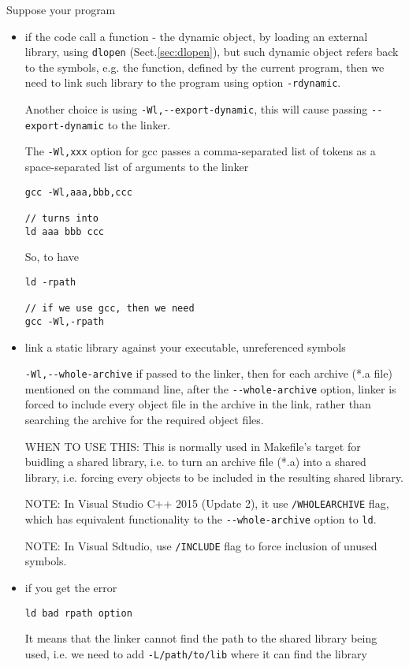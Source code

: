 Suppose your program 
\begin{itemize}
  
  \item  if the code call a function - the dynamic object, by loading an external library, using 
  \verb!dlopen! (Sect.\ref{sec:dlopen}), but such dynamic object refers back to the symbols, e.g. the function, 
  defined by the current program, then we need to link such library to the program using option \verb!-rdynamic!.  
  
  Another choice is using \verb!-Wl,--export-dynamic!, this will cause passing
  \verb!--export-dynamic! to the linker.
  
\begin{mdframed}

The \verb!-Wl,xxx! option for gcc passes a comma-separated list of tokens as a space-separated list of arguments to the linker

\begin{verbatim}
gcc -Wl,aaa,bbb,ccc

// turns into 
ld aaa bbb ccc
\end{verbatim}

So, to have 
\begin{verbatim}
ld -rpath

// if we use gcc, then we need
gcc -Wl,-rpath
\end{verbatim}

\end{mdframed}
  
  \item link a static library against your executable, unreferenced symbols
  
  
\verb!-Wl,--whole-archive! if passed to the linker, then for each archive (*.a
file) mentioned on the command line, after the \verb!--whole-archive! option, 
linker is forced to include every object file in the archive in the link, rather
than searching the archive for the required object files.

WHEN TO USE THIS: This is normally used in Makefile's target for buidling a
shared library, i.e. to turn an archive file (*.a) into a shared library, i.e.
forcing every objects to be included in the resulting shared library.

NOTE: In Visual Studio C++ 2015 (Update 2), it use \verb!/WHOLEARCHIVE! flag,
which has equivalent functionality to the \verb!--whole-archive! option to
\verb!ld!.  

NOTE: In Visual Sdtudio, use \verb!/INCLUDE! flag to force inclusion of unused symbols.


   \item if you get the error 

\begin{verbatim}
ld bad rpath option
\end{verbatim}
It means that the linker cannot find the path to the shared library being used, i.e. we need to add \verb!-L/path/to/lib! 
where it can find the library

\end{itemize}



